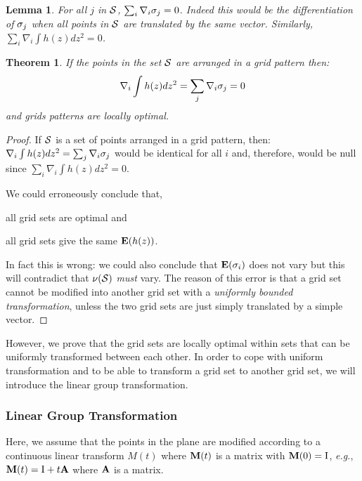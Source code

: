 \documentclass[12pt,english]{article}
\newtheorem{lemma}{Lemma}[section]
\newtheorem{theorem}{Theorem}[section]
\begin{document}
\begin{lemma}
For all $j$ in ${\cal S}$, \mbox{$\sum_{i}\nabla_i\ss_j=0$}. Indeed this would be the differentiation of $\ss_j$ when all points in ${\cal S}$ are translated by the same vector. Similarly, \mbox{$\sum_{i}\nabla_i\int  h(z)dz^2=0$}. 
\end{lemma}

\begin{theorem}
If the points in the set ${\cal S}$ are arranged in a grid pattern then: 
$$
\nabla_i \int h(z)dz^2=\sum_{j}\nabla_i\ss_j=0
$$ 
and grids patterns are {\em locally} optimal. \end{theorem}

\begin{proof}
If ${\cal S}$ is a set of points arranged in a grid pattern, then: \mbox{$\nabla_i \int h(z)dz^2=\sum_{j}\nabla_i\ss_j$} would be identical for all $i$ and, therefore, would be null since \mbox{$\sum_{i}\nabla_i\int  h(z)dz^2=0$}. 

We could erroneously conclude that,
\begin{compactitem}[-]
\item all grid sets are optimal and
\item all grid sets give the same $\E(h(z))$.
\end{compactitem}
In fact this is wrong: we could also conclude that $\E(\ss_i)$ does not vary but this will contradict that $\nu({\cal S})$ {\em must} vary. The reason of this error is that a grid set cannot be modified into another grid set with a {\em uniformly bounded transformation}, unless the two grid sets are just simply translated by a simple vector. 
\end{proof}

However, we prove that the grid sets are locally optimal within sets that can be uniformly transformed between each other. In order to cope with uniform transformation and to be able to transform a grid set to another grid set, we will introduce the linear group transformation. 

\subsubsection{Linear Group Transformation}

Here, we assume that the points in the plane are modified according to a continuous linear transform $M(t)$ where $\BM(t)$ is a matrix with \mbox{$\BM(0)=\BI$}, {\it e.g.}, \mbox{$\BM(t)=\BI+t\BA$} where $\BA$ is a matrix. 
\end{document}
